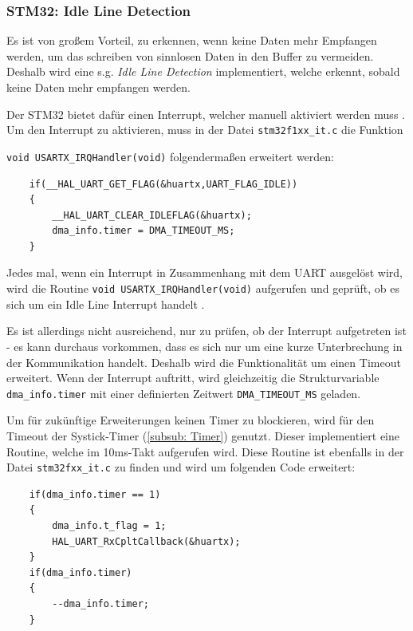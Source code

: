   \subsubsection{STM32: Idle Line Detection}
  \label{subsub: Idle}

  Es ist von großem Vorteil, zu erkennen, wenn keine Daten mehr Empfangen werden, um das schreiben von sinnlosen Daten in den Buffer zu vermeiden.
  Deshalb wird eine s.g. \textit{Idle Line Detection} implementiert, welche erkennt, sobald keine Daten mehr empfangen werden.

  \newpage

  Der STM32 bietet dafür einen Interrupt, welcher manuell aktiviert werden muss \citep{STM32_Ref}. Um den Interrupt zu aktivieren, muss in der Datei
  \lstinline!stm32f1xx_it.c! die Funktion 
  
  \lstinline!void USARTX_IRQHandler(void)! folgendermaßen erweitert werden:

  \begin{lstlisting}
    if(__HAL_UART_GET_FLAG(&huartx,UART_FLAG_IDLE))
    {
        __HAL_UART_CLEAR_IDLEFLAG(&huartx);
        dma_info.timer = DMA_TIMEOUT_MS;
    }
  \end{lstlisting}

  Jedes mal, wenn ein Interrupt in Zusammenhang mit dem \ac{UART} ausgelöst wird, wird die Routine \lstinline!void USARTX_IRQHandler(void)! 
  aufgerufen  und geprüft, ob es sich um ein Idle Line Interrupt handelt \citep{STM32_Ref}. 

  \smallskip

  Es ist allerdings nicht ausreichend, nur zu prüfen, ob der Interrupt aufgetreten ist - es kann durchaus vorkommen, dass es sich nur um eine
  kurze Unterbrechung in der Kommunikation handelt. Deshalb wird die Funktionalität um einen Timeout erweitert. Wenn der Interrupt auftritt, wird
  gleichzeitig die Strukturvariable \lstinline!dma_info.timer! mit einer definierten Zeitwert \lstinline!DMA_TIMEOUT_MS! geladen.

  \smallskip

  Um für zukünftige Erweiterungen keinen Timer zu blockieren, wird für den Timeout der Systick-Timer (\ref{subsub: Timer}) genutzt. Dieser implementiert eine Routine,
  welche im 10ms-Takt aufgerufen wird. Diese Routine ist ebenfalls in der Datei \lstinline!stm32fxx_it.c! zu finden und wird um folgenden Code
  erweitert:

  \begin{lstlisting}
    if(dma_info.timer == 1)
    {
        dma_info.t_flag = 1;
        HAL_UART_RxCpltCallback(&huartx);
    }
    if(dma_info.timer) 
    { 
        --dma_info.timer; 
    }



  \end{lstlisting}
  
